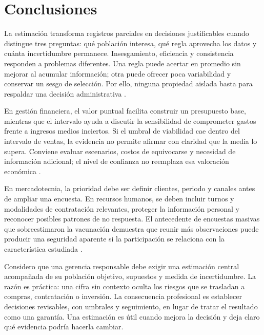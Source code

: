 {\clearpage
\section{Conclusiones}
La estimación transforma registros parciales en decisiones justificables cuando distingue tres preguntas: qué población interesa, qué regla aprovecha los datos y cuánta incertidumbre permanece. Insesgamiento, eficiencia y consistencia responden a problemas diferentes. Una regla puede acertar en promedio sin mejorar al acumular información; otra puede ofrecer poca variabilidad y conservar un sesgo de selección. Por ello, ninguna propiedad aislada basta para respaldar una decisión administrativa \citep{holmesBusiness2023,bradley2021}.

En gestión financiera, el valor puntual facilita construir un presupuesto base, mientras que el intervalo ayuda a discutir la sensibilidad de comprometer gastos frente a ingresos medios inciertos. Si el umbral de viabilidad cae dentro del intervalo de ventas, la evidencia no permite afirmar con claridad que la media lo supera. Conviene evaluar escenarios, costos de equivocarse y necesidad de información adicional; el nivel de confianza no reemplaza esa valoración económica \citep{nistHandbook}.

En mercadotecnia, la prioridad debe ser definir clientes, periodo y canales antes de ampliar una encuesta. En recursos humanos, se deben incluir turnos y modalidades de contratación relevantes, proteger la información personal y reconocer posibles patrones de no respuesta. El antecedente de encuestas masivas que sobreestimaron la vacunación demuestra que reunir más observaciones puede producir una seguridad aparente si la participación se relaciona con la característica estudiada \citep{bradley2021}.

Considero que una gerencia responsable debe exigir una estimación central acompañada de su población objetivo, supuestos y medida de incertidumbre. La razón es práctica: una cifra sin contexto oculta los riesgos que se trasladan a compras, contratación o inversión. La consecuencia profesional es establecer decisiones revisables, con umbrales y seguimiento, en lugar de tratar el resultado como una garantía. Una estimación es útil cuando mejora la decisión y deja claro qué evidencia podría hacerla cambiar.

}
